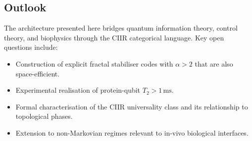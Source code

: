 \subsection{Outlook}

The architecture presented here bridges quantum information theory,
control theory, and biophysics through the CIIR categorical language.
Key open questions include:
\begin{itemize}[nosep]
  \item Construction of explicit fractal stabiliser codes with $\alpha > 2$
        that are also space-efficient.
  \item Experimental realisation of protein-qubit $T_2 > 1\,\text{ms}$.
  \item Formal characterisation of the CIIR universality class and its
        relationship to topological phases.
  \item Extension to non-Markovian regimes relevant to in-vivo biological
        interfaces.
\end{itemize}
